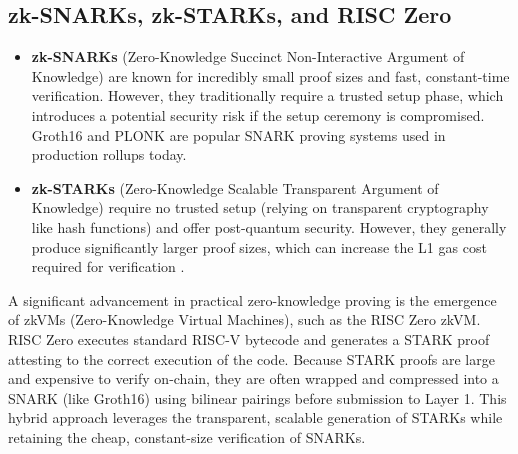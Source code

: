 \subsection{zk-SNARKs, zk-STARKs, and RISC Zero}
\label{sec:snarks_starks}

\begin{itemize}
    \item \textbf{zk-SNARKs} (Zero-Knowledge Succinct Non-Interactive Argument of Knowledge) are known for incredibly small proof sizes and fast, constant-time verification. However, they traditionally require a trusted setup phase, which introduces a potential security risk if the setup ceremony is compromised. Groth16 and PLONK are popular SNARK proving systems used in production rollups today.
    \item \textbf{zk-STARKs} (Zero-Knowledge Scalable Transparent Argument of Knowledge) require no trusted setup (relying on transparent cryptography like hash functions) and offer post-quantum security. However, they generally produce significantly larger proof sizes, which can increase the L1 gas cost required for verification \citep{ben2018stark}.
\end{itemize}

A significant advancement in practical zero-knowledge proving is the emergence of zkVMs (Zero-Knowledge Virtual Machines), such as the RISC Zero zkVM. RISC Zero executes standard RISC-V bytecode and generates a STARK proof attesting to the correct execution of the code. Because STARK proofs are large and expensive to verify on-chain, they are often wrapped and compressed into a SNARK (like Groth16) using bilinear pairings before submission to Layer 1. This hybrid approach leverages the transparent, scalable generation of STARKs while retaining the cheap, constant-size verification of SNARKs.